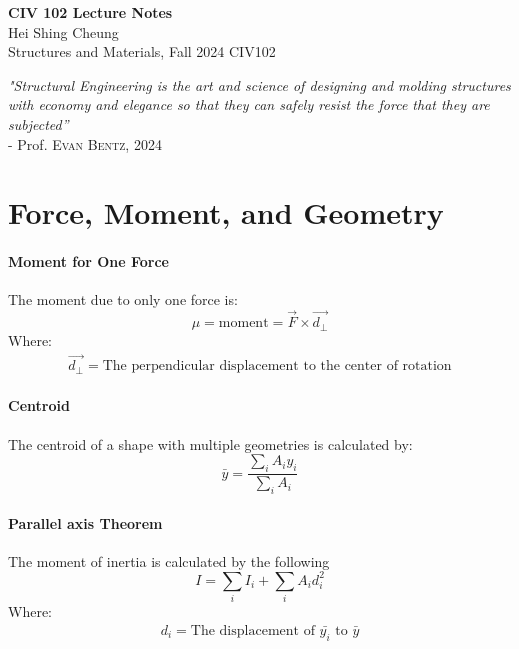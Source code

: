 \documentclass[11pt]{article}
\begin{document}
\thispagestyle{empty}
{\LARGE \bf CIV 102 Lecture Notes}\\
{\large Hei Shing Cheung}\\
Structures and Materials, Fall 2024 \hfill CIV102\\
\begin{center}
\textit{"Structural Engineering is the art and science of designing and molding structures with economy and elegance so that they can safely resist the force that they are subjected''} \\ - Prof. \textsc{Evan Bentz, 2024}
\end{center}
\vspace{10pt}
\section{Force, Moment, and Geometry} 
    \paragraph{Moment for One Force} The moment due to only one force is:
    \begin{equation}
        \mu = \mathrm{moment} = \Vec{F}\times\Vec{d_\perp}
    \end{equation}
Where:
\begin{equation*}
\begin{split}
\Vec{d_\perp} = \text{The perpendicular displacement to the center of rotation}
\end{split}
\end{equation*}
\paragraph{Centroid} The centroid of a shape with multiple geometries is calculated by: 
\begin{equation}
\bar{y} = \frac{\sum_i A_i  y_i}{\sum_i A_i}
\end{equation}
\paragraph{Parallel axis Theorem} The moment of inertia is calculated by the following
\begin{equation}
    I = \sum_i I_{i} + \sum_i A_i d_i^2
\end{equation}
Where:
\begin{equation*}
\begin{split}
d_i = \text{The displacement of $\bar{y_i}$ to $\bar{y}$}
\end{split}
\end{equation*}
\end{document}
